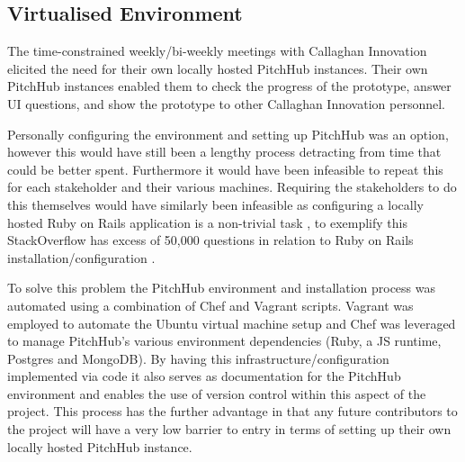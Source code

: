 \subsection{Virtualised Environment}
The time-constrained weekly/bi-weekly meetings with Callaghan Innovation elicited the need for their own locally hosted PitchHub instances. Their own PitchHub instances enabled them to check the progress of the prototype, answer UI questions, and show the prototype to other Callaghan Innovation personnel. 
\par
Personally configuring the environment and setting up PitchHub was an option, however this would have still been a lengthy process detracting from time that could be better spent. Furthermore it would have been infeasible to repeat this for each stakeholder and their various machines. Requiring the stakeholders to do this themselves would have similarly been infeasible as configuring a locally hosted Ruby on Rails application is a non-trivial task \cite{Roma:personalCommunications}, to exemplify this StackOverflow has excess of 50,000 questions in relation to Ruby on Rails installation/configuration \cite{StackOverflowProblem1:online, StackOverflowProblem2:online, StackOverflowProblem3:online, StackOverflowProblem4:online}.
\par
To solve this problem the PitchHub environment and installation process was automated using a combination of Chef and Vagrant scripts. Vagrant was employed to automate the Ubuntu virtual machine setup and Chef was leveraged to manage PitchHub's various environment dependencies (Ruby, a JS runtime, Postgres and MongoDB). By having this infrastructure/configuration implemented via code it also serves as documentation for the PitchHub environment and enables the use of version control within this aspect of the project. This process has the further advantage in that any future contributors to the project will have a very low barrier to entry in terms of setting up their own locally hosted PitchHub instance.

